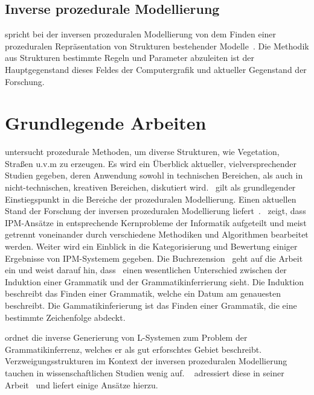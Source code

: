 \subsection*{Inverse prozedurale Modellierung}
\citeauthor{aliaga_2016} spricht bei der inversen prozeduralen Modellierung von dem Finden einer prozeduralen Repräsentation
von Strukturen bestehender Modelle~\cite{aliaga_2016}.
Die Methodik aus Strukturen bestimmte Regeln und Parameter abzuleiten ist der Hauptgegenstand dieses Feldes der
Computergrafik und aktueller Gegenstand der Forschung.

\section{Grundlegende Arbeiten}

\citeauthor{smelik_2014} untersucht prozedurale Methoden, um diverse Strukturen, wie Vegetation, Straßen u.v.m zu erzeugen.
Es wird ein Überblick aktueller, vielversprechender Studien gegeben, deren Anwendung sowohl in technischen Bereichen,
als auch in nicht-technischen, kreativen Bereichen, diskutiert wird.~\cite{smelik_2014} gilt als grundlegender Einstiegspunkt
in die Bereiche der prozeduralen Modellierung.
Einen aktuellen Stand der Forschung der inversen prozeduralen Modellierung liefert~\cite{aliaga_2016}.~
zeigt, dass IPM-Ansätze in entsprechende Kernprobleme der Informatik aufgeteilt und meist getrennt voneinander durch
verschiedene Methodiken und Algorithmen bearbeitet werden.
Weiter wird ein Einblick in die Kategorisierung und Bewertung einiger Ergebnisse von IPM-Systemem gegeben.
Die Buchrezension~\cite{daelemans_2010} geht auf die Arbeit~\cite{higuera_2010} ein und weist darauf hin, dass~\citeauthor{higuera_2010}
einen wesentlichen Unterschied zwischen der Induktion einer Grammatik und der Grammatikinferrierung sieht.
Die Induktion beschreibt das Finden einer Grammatik, welche ein Datum am genauesten beschreibt.
Die Gammatikinferierung ist das Finden einer Grammatik, die eine bestimmte Zeichenfolge abdeckt.

\newpage

\citeauthor{higuera_2010} ordnet die inverse Generierung von L-Systemen zum Problem der Grammatikinferrenz, welches er
als gut erforschtes Gebiet beschreibt.
Verzweigungsstrukturen im Kontext der inversen prozeduralen Modellierung tauchen in wissenschaftlichen Studien wenig auf.
~\cite{guo_2020} adressiert diese in seiner Arbeit~\cite{guo_2020} und liefert einige Ansätze hierzu.\\~\\


